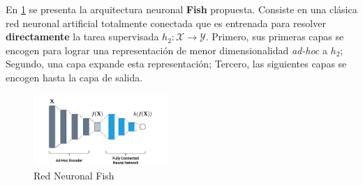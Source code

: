 En \ref{fig:fish} se presenta la arquitectura neuronal \textbf{Fish} propuesta. Consiste en una clásica red neuronal artificial totalmente conectada que es entrenada para resolver \textbf{directamente} la tarea supervisada $h_2\colon \mathcal{X} \rightarrow \mathcal{Y}$. Primero, sus primeras capas se encogen para lograr una representación de menor dimensionalidad \textit{ad-hoc} a $h_2$; Segundo, una capa expande esta representación; Tercero, las siguientes capas se encogen hasta la capa de salida.

\begin{figure}[h]
\centering
\includegraphics[width=0.45\textwidth]{fish}
\caption{\label{fig:fish} Red Neuronal Fish}
\end{figure}